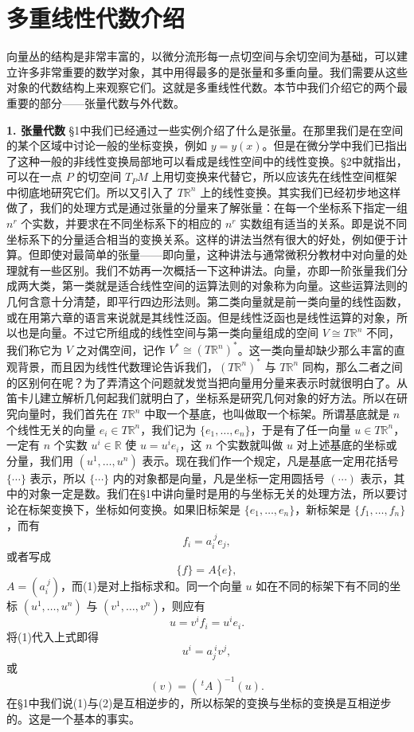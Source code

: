 
\section{多重线性代数介绍}

向量丛的结构是非常丰富的，以微分流形每一点切空间与余切空间为基础，可以建立许多非常重要的数学对象，其中用得最多的是张量和多重向量。我们需要从这些对象的代数结构上来观察它们。这就是多重线性代数。本节中我们介绍它的两个最重要的部分——张量代数与外代数。

\noindent\textbf{1. 张量代数}\quad
§1中我们已经通过一些实例介绍了什么是张量。在那里我们是在空间的某个区域中讨论一般的坐标变换，例如 $y=y(x)$。但是在微分学中我们已指出了这种一般的非线性变换局部地可以看成是线性空间中的线性变换。§2中就指出，可以在一点 $P$ 的切空间 $T_PM$ 上用切变换来代替它，所以应该先在线性空间框架中彻底地研究它们。所以又引入了 $T\mathbb R^n$ 上的线性变换。其实我们已经初步地这样做了，我们的处理方式是通过张量的分量来了解张量：在每一个坐标系下指定一组 $n^r$ 个实数，并要求在不同坐标系下的相应的 $n^r$ 实数组有适当的关系。即是说不同坐标系下的分量适合相当的变换关系。这样的讲法当然有很大的好处，例如便于计算。但即使对最简单的张量——即向量，这种讲法与通常微积分教材中对向量的处理就有一些区别。我们不妨再一次概括一下这种讲法。向量，亦即一阶张量我们分成两大类，第一类就是适合线性空间的运算法则的对象称为向量。这些运算法则的几何含意十分清楚，即平行四边形法则。第二类向量就是前一类向量的线性函数，或在用第六章的语言来说就是其线性泛函。但是线性泛函也是线性运算的对象，所以也是向量。不过它所组成的线性空间与第一类向量组成的空间 $V\cong T\mathbb R^n$ 不同，我们称它为 $V$ 之对偶空间，记作 $V^*\cong(T\mathbb R^n)^*$。这一类向量却缺少那么丰富的直观背景，而且因为线性代数理论告诉我们，$(T\mathbb R^n)^*$ 与 $T\mathbb R^n$ 同构，那么二者之间的区别何在呢？为了弄清这个问题就发觉当把向量用分量来表示时就很明白了。从笛卡儿建立解析几何起我们就明白了，坐标系是研究几何对象的好方法。所以在研究向量时，我们首先在 $T\mathbb R^n$ 中取一个基底，也叫做取一个标架。所谓基底就是 $n$ 个线性无关的向量 $e_i\in T\mathbb R^n$，我们记为 $\{e_1,\ldots,e_n\}$，于是有了任一向量 $u\in T\mathbb R^n$，一定有 $n$ 个实数 $u^i\in\mathbb R$ 使 $u=u^ie_i$，这 $n$ 个实数就叫做 $u$ 对上述基底的坐标或分量，我们用 $(u^1,\ldots,u^n)$ 表示。现在我们作一个规定，凡是基底一定用花括号 $\{\cdots\}$ 表示，所以 $\{\cdots\}$ 内的对象都是向量，凡是坐标一定用圆括号 $(\cdots)$ 表示，其中的对象一定是数。我们在§1中讲向量时是用的与坐标无关的处理方法，所以要讨论在标架变换下，坐标如何变换。如果旧标架是 $\{e_1,\ldots,e_n\}$，新标架是 $\{f_1,\ldots,f_n\}$，而有
\begin{equation}
 f_i=a_i^{\ j}e_j,
 \tag{1}
\end{equation}
或者写成
\[
 \{f\}=A\{e\},
\]
$A=(a_i^{\ j})$，而(1)是对上指标求和。同一个向量 $u$ 如在不同的标架下有不同的坐标 $(u^1,\ldots,u^n)$ 与 $(v^1,\ldots,v^n)$，则应有
\[
 u=v^if_i=u^ie_i.
\]
将(1)代入上式即得
\begin{equation}
 u^i=a_j^{\ i}v^j,
 \tag{2}
\end{equation}
或
\[
 (v)=(\,{}^tA\,)^{-1}(u).
\]
在§1中我们说(1)与(2)是互相逆步的，所以标架的变换与坐标的变换是互相逆步的。这是一个基本的事实。


